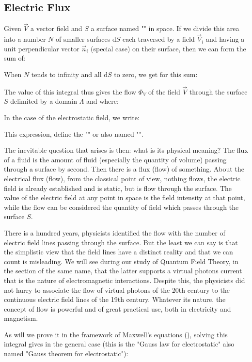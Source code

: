 	\subsection{Electric Flux}
	Given $\vec{V}$ a vector field and $S$ a surface named "" in space. If we divide this area into a number $N$ of smaller surfaces $\mathrm{d}S$ each traversed by a field $\vec{V}_i$ and having a unit perpendicular vector $\vec{n}_i$ (special case) on their surface, then we can form the sum of:
	
	When $N$ tends to infinity and all $\mathrm{d}S$ to zero, we get for this sum:
	
	The value of this integral thus gives the flow $\Phi_V$ of the field $\vec{V}$ through the surface $S$ delimited by a domain $\Lambda$ and where:
	
	In the case of the electrostatic field, we write:
	
	This expression, define the "" or also named "".	
	
	The inevitable question that arises is then: what is its physical meaning? The flux of a fluid is the amount of fluid (especially the quantity of volume) passing through a surface by second. Then there is a flux (flow) of something. About the electrical flux (flow), from the classical point of view, nothing flows, the electric field is already established and is static, but is flow through the surface. The value of the electric field at any point in space is the field intensity at that point, while the flow can be considered the quantity of field which passes through the surface $S$. 

	There is a hundred years, physicists identified the flow with the number of electric field lines passing through the surface. But the least we can say is that the simplistic view that the field lines have a distinct reality and that we can count is misleading. We will see during our study of Quantum Field Theory, in the section of the same name, that the latter supports a virtual photons current that is the nature of electromagnetic interactions. Despite this, the physicists did not hurry to associate the flow of virtual photons of the 20th century to the continuous electric field lines of the 19th century. Whatever its nature, the concept of flow is powerful and of great practical use, both in electricity and magnetism.
	
	As will we prove it in the framework of Maxwell's equations (), solving this integral gives in the general case (this is the "Gauss law for electrostatic" also named "Gauss theorem for electrostatic"):
	
